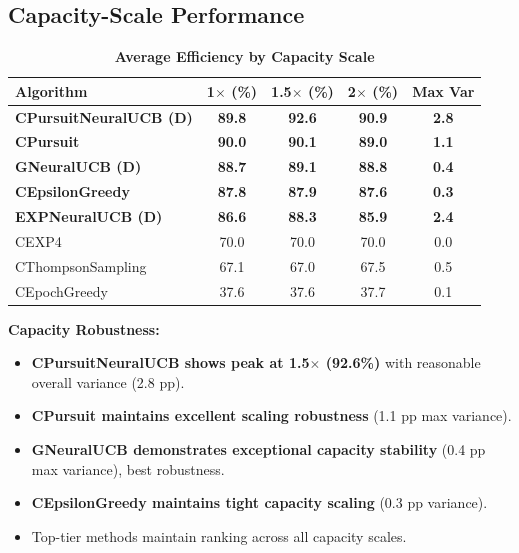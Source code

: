 \documentclass[12pt,a4paper]{article}
\newcommand{\performance}[1]{\textcolor{performancecolor}{\textbf{#1}}}
\newcommand{\legacy}[1]{\textcolor{legacycolor}{\textbf{#1}}}
\newcommand{\neural}[1]{\textcolor{neuralcolor}{\textbf{#1}}}
\begin{document}
\subsection{Capacity-Scale Performance}

\begin{table}[H]
\centering
\caption{\performance{Average Efficiency by Capacity Scale}}
\begin{tabular}{|l|c|c|c|c|}
\hline
\textbf{Algorithm} & \textbf{1$\times$ (\%)} & \textbf{1.5$\times$ (\%)} & \textbf{2$\times$ (\%)} & \textbf{Max Var} \\
\hline
\hline
\neural{CPursuitNeuralUCB (D)}   & \neural{89.8}     & \neural{92.6}     & \neural{90.9} & \neural{2.8} \\
\performance{CPursuit}           & \performance{90.0} & \performance{90.1} & \performance{89.0} & \performance{1.1} \\
\neural{GNeuralUCB (D)}          & \neural{88.7}     & \neural{89.1}     & \neural{88.8} & \neural{0.4} \\
\performance{CEpsilonGreedy}     & \performance{87.8} & \performance{87.9} & \performance{87.6} & \performance{0.3} \\
\legacy{EXPNeuralUCB (D)}        & \legacy{86.6}     & \legacy{88.3}     & \legacy{85.9} & \legacy{2.4} \\
CEXP4                           & 70.0              & 70.0              & 70.0 & 0.0 \\
CThompsonSampling               & 67.1              & 67.0              & 67.5 & 0.5 \\
CEpochGreedy                    & 37.6              & 37.6              & 37.7 & 0.1 \\
\hline
\end{tabular}
\end{table}

\textbf{Capacity Robustness:}
\begin{itemize}
\item \neural{CPursuitNeuralUCB shows peak at 1.5$\times$ (92.6\%)} with reasonable overall variance (2.8 pp).
\item \performance{CPursuit maintains excellent scaling robustness} (1.1 pp max variance).
\item \neural{GNeuralUCB demonstrates exceptional capacity stability} (0.4 pp max variance), best robustness.
\item \performance{CEpsilonGreedy maintains tight capacity scaling} (0.3 pp variance).
\item Top-tier methods maintain ranking across all capacity scales.
\end{itemize}
\end{document}
